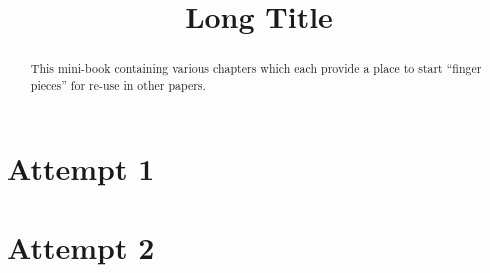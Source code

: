 \documentclass[a4paper,openany]{amsbook}
\begin{document}
\sloppy

\title[Short Title]{Long Title}

%

\begin{abstract}
This mini-book containing various chapters which each provide a place to start
``finger pieces'' for re-use in other papers.
\end{abstract} 
\maketitle 
\tableofcontents 

\chapter{Attempt 1}


\chapter{Attempt 2}


\printbibliography
\end{document}
